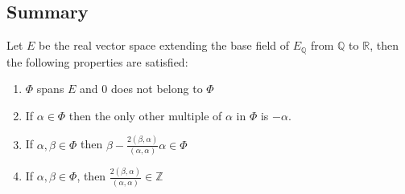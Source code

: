 \subsection*{Summary}
Let $E$ be the real vector space extending the base field of $E_\mathbb{Q}$ from $\mathbb{Q}$ to $\mathbb{R}$, then the following properties are satisfied:
\begin{enumerate}[label=(\alph*)]
	\item $\Phi$ spans $E$ and $0$ does not belong to $\Phi$
	\item If $\alpha \in \Phi$ then the only other multiple of $\alpha$ in $\Phi$ is $-\alpha$.
	\item If $\alpha,\beta \in \Phi$ then $\displaystyle \beta - \frac{2(\beta,\alpha)}{(\alpha,\alpha)}\alpha \in \Phi$
	\item If $\alpha,\beta \in \Phi$, then $\frac{2(\beta,\alpha)}{(\alpha,\alpha)} \in \mathbb{Z}$
	\label{RootSystemLie}
\end{enumerate}
